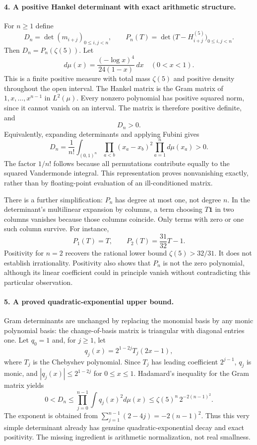 \documentclass[11pt]{article}
\begin{document}
\paragraph{4. A positive Hankel determinant with exact arithmetic structure.}
For $n\geq1$ define
\[
 D_n=\det(m_{i+j})_{0\leq i,j<n},\qquad
 P_n(T)=\det\bigl(T-H_{i+j}^{(5)}\bigr)_{0\leq i,j<n}.
\]
Then $D_n=P_n(\zeta(5))$. Let
\[
 d\mu(x)=\frac{(-\log x)^4}{24(1-x)}\,dx\quad(0<x<1).
\]
This is a finite positive measure with total mass $\zeta(5)$ and positive density throughout the open interval. The Hankel matrix is the Gram matrix of $1,x,\ldots,x^{n-1}$ in $L^2(\mu)$. Every nonzero polynomial has positive squared norm, since it cannot vanish on an interval. The matrix is therefore positive definite, and
\[
 D_n>0.
\]
Equivalently, expanding determinants and applying Fubini gives
\[
 D_n=\frac1{n!}\int_{(0,1)^n}\prod_{a<b}(x_a-x_b)^2\prod_{a=1}^nd\mu(x_a)>0.
\]
The factor $1/n!$ follows because all permutations contribute equally to the squared Vandermonde integral. This representation proves nonvanishing exactly, rather than by floating-point evaluation of an ill-conditioned matrix.

There is a further simplification: $P_n$ has degree at most one, not degree $n$. In the determinant's multilinear expansion by columns, a term choosing $T\mathbf1$ in two columns vanishes because those columns coincide. Only terms with zero or one such column survive. For instance,
\[
 P_1(T)=T,\qquad P_2(T)=\frac{31}{32}T-1.
\]
Positivity for $n=2$ recovers the rational lower bound $\zeta(5)>32/31$. It does not establish irrationality. Positivity also shows that $P_n$ is not the zero polynomial, although its linear coefficient could in principle vanish without contradicting this particular observation.

\paragraph{5. A proved quadratic-exponential upper bound.}
Gram determinants are unchanged by replacing the monomial basis by any monic polynomial basis: the change-of-basis matrix is triangular with diagonal entries one. Let $q_0=1$ and, for $j\geq1$, let
\[
 q_j(x)=2^{1-2j}T_j(2x-1),
\]
where $T_j$ is the Chebyshev polynomial. Since $T_j$ has leading coefficient $2^{j-1}$, $q_j$ is monic, and $|q_j(x)|\leq2^{1-2j}$ for $0\leq x\leq1$. Hadamard's inequality for the Gram matrix yields
\[
 0<D_n\leq\prod_{j=0}^{n-1}\int q_j(x)^2d\mu(x)
 \leq\zeta(5)^n\,2^{-2(n-1)^2}.
\]
The exponent is obtained from $\sum_{j=1}^{n-1}(2-4j)=-2(n-1)^2$. Thus this very simple determinant already has genuine quadratic-exponential decay and exact positivity. The missing ingredient is arithmetic normalization, not real smallness.
\end{document}
